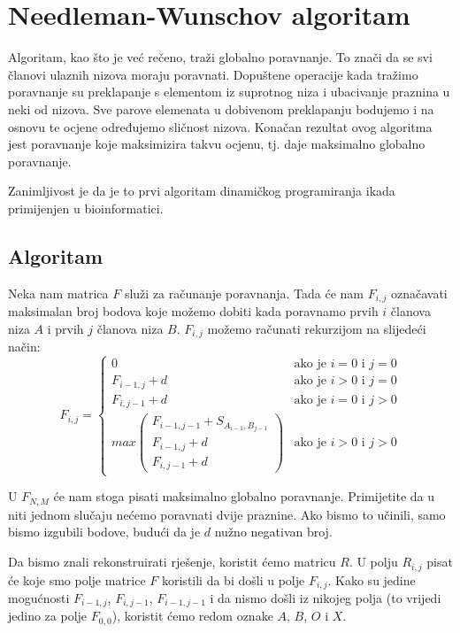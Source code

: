 \documentclass[times, utf8, zavrsni]{fer}
\begin{document}
\section{Needleman-Wunschov algoritam}
\label{sec:nwalg}
Algoritam, kao što je već rečeno, traži globalno poravnanje. To znači da se svi 
članovi ulaznih nizova moraju poravnati. Dopuštene operacije kada tražimo poravnanje
su preklapanje s elementom iz suprotnog niza i ubacivanje praznina u neki od nizova.
Sve parove elemenata u dobivenom preklapanju bodujemo i na osnovu te ocjene
određujemo sličnost nizova. Konačan rezultat ovog algoritma jest poravnanje koje
maksimizira takvu ocjenu, tj. daje maksimalno globalno poravnanje.

Zanimljivost je da je to prvi algoritam dinamičkog programiranja ikada primijenjen
u bioinformatici.

\subsection{Algoritam}
\label{subsec:nwalg}
Neka nam matrica $F$ služi za računanje poravnanja. 
Tada će nam $F_{i,j}$ označavati maksimalan broj bodova koje možemo dobiti kada
poravnamo prvih $i$ članova niza $A$ i prvih $j$ članova niza $B$. $F_{i,j}$ možemo
računati rekurzijom na slijedeći način:
$$
F_{i,j} = \left\{
	\begin{array}{lr}
		0 & \mbox{ako je } i=0 \mbox{ i } j=0 \\
		F_{i-1,j} + d & \mbox{ako je } i>0 \mbox{ i } j=0 \\
		F_{i,j-1} + d & \mbox{ako je } i=0 \mbox{ i } j>0 \\
		max \left(
			\begin{array}{l}
				F_{i-1,j-1} + S_{A_{i-1}, B_{j-1}} \\
				F_{i-1, j} + d \\
				F_{i, j-1} + d
			\end{array}
		\right) & \mbox{ako je } i>0 \mbox{ i } j>0
	\end{array}
\right.
$$

U $F_{N,M}$ će nam stoga pisati maksimalno globalno poravnanje. Primijetite da
u niti jednom slučaju nećemo poravnati dvije praznine. Ako bismo to učinili, 
samo bismo izgubili bodove, budući da je $d$ nužno negativan broj.

Da bismo znali rekonstruirati rješenje, koristit ćemo matricu $R$. U
polju $R_{i,j}$  pisat će koje smo polje matrice $F$ koristili da bi došli u
polje $F_{i,j}$. Kako su jedine mogućnosti $F_{i-1,j}$, $F_{i,j-1}$, $F_{i-1,j-1}$
i da nismo došli iz nikojeg polja (to vrijedi jedino za polje $F_{0,0}$), koristit
ćemo redom oznake $A$, $B$, $O$ i $X$. 
\end{document}
